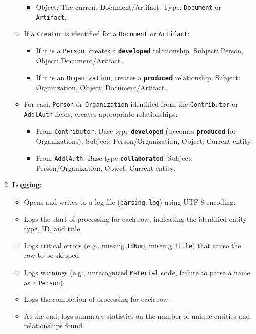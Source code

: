 \documentclass[11pt, a4paper]{article}
\begin{document}
\begin{enumerate}
\begin{itemize}
\begin{itemize}
                    \item Object: The current Document/Artifact. Type: \texttt{Document} or \texttt{Artifact}.
                \end{itemize}
            \item If a \texttt{Creator} is identified for a \texttt{Document} or \texttt{Artifact}:
                \begin{itemize}
                    \item If it is a \texttt{Person}, creates a \textbf{\texttt{developed}} relationship. Subject: Person, Object: Document/Artifact.
                    \item If it is an \texttt{Organization}, creates a \textbf{\texttt{produced}} relationship. Subject: Organization, Object: Document/Artifact.
                \end{itemize}
            \item For each \texttt{Person} or \texttt{Organization} identified from the \texttt{Contributor} or \texttt{AddlAuth} fields, creates appropriate relationships:
                \begin{itemize}
                    \item From \texttt{Contributor}: Base type \textbf{\texttt{developed}} (becomes \textbf{\texttt{produced}} for Organizations). Subject: Person/Organization, Object: Current entity.
                    \item From \texttt{AddlAuth}: Base type \textbf{\texttt{collaborated}}. Subject: Person/Organization, Object: Current entity.
                \end{itemize}
        \end{itemize}

    \item \textbf{Logging:}
        \begin{itemize}
            \item Opens and writes to a log file (\texttt{parsing.log}) using UTF-8 encoding.
            \item Logs the start of processing for each row, indicating the identified entity type, ID, and title.
            \item Logs critical errors (e.g., missing \texttt{IdNum}, missing \texttt{Title}) that cause the row to be skipped.
            \item Logs warnings (e.g., unrecognized \texttt{Material} code, failure to parse a name as a \texttt{Person}).
            \item Logs the completion of processing for each row.
            \item At the end, logs summary statistics on the number of unique entities and relationships found.
        \end{itemize}


\end{enumerate}
\end{document}
